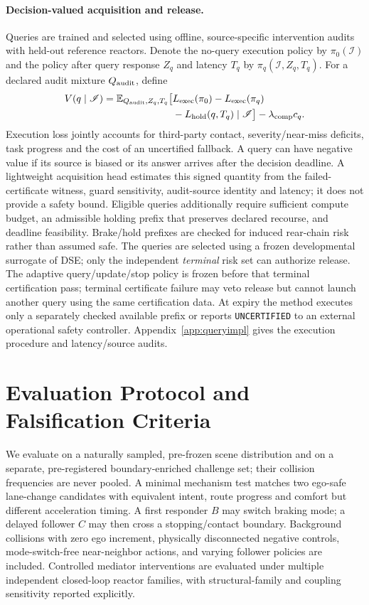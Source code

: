 \documentclass[10pt]{article}
\newcommand{\E}{\mathbb{E}}
\begin{document}
\paragraph{Decision-valued acquisition and release.}
Queries are trained and selected using offline, source-specific intervention audits with held-out reference reactors. Denote the no-query execution policy by $\pi_0(\mathscr I)$ and the policy after query response $Z_q$ and latency $T_q$ by $\pi_q(\mathscr I,Z_q,T_q)$. For a declared audit mixture $Q_{\rm audit}$, define
\begin{align}
 V(q\mid\mathscr I)=\E_{Q_{\rm audit},Z_q,T_q}\big[&L_{\rm exec}(\pi_0)-L_{\rm exec}(\pi_q)\nonumber\\
 &-L_{\rm hold}(q,T_q)\mid\mathscr I\big]-\lambda_{\rm comp}c_q.
 \label{eq:verificationvalue}
\end{align}
Execution loss jointly accounts for third-party contact, severity/near-miss deficits, task progress and the cost of an uncertified fallback. A query can have negative value if its source is biased or its answer arrives after the decision deadline. A lightweight acquisition head estimates this signed quantity from the failed-certificate witness, guard sensitivity, audit-source identity and latency; it does not provide a safety bound. Eligible queries additionally require sufficient compute budget, an admissible holding prefix that preserves declared recourse, and deadline feasibility. Brake/hold prefixes are checked for induced rear-chain risk rather than assumed safe. The queries are selected using a frozen developmental surrogate of DSE; only the independent \emph{terminal} risk set can authorize release. The adaptive query/update/stop policy is frozen before that terminal certification pass; terminal certificate failure may veto release but cannot launch another query using the same certification data. At expiry the method executes only a separately checked available prefix or reports \texttt{UNCERTIFIED} to an external operational safety controller. Appendix~\ref{app:queryimpl} gives the execution procedure and latency/source audits.

\section{Evaluation Protocol and Falsification Criteria}
\label{sec:evaluation}
We evaluate on a naturally sampled, pre-frozen scene distribution and on a separate, pre-registered boundary-enriched challenge set; their collision frequencies are never pooled. A minimal mechanism test matches two ego-safe lane-change candidates with equivalent intent, route progress and comfort but different acceleration timing. A first responder $B$ may switch braking mode; a delayed follower $C$ may then cross a stopping/contact boundary. Background collisions with zero ego increment, physically disconnected negative controls, mode-switch-free near-neighbor actions, and varying follower policies are included. Controlled mediator interventions are evaluated under multiple independent closed-loop reactor families, with structural-family and coupling sensitivity reported explicitly.
\end{document}
